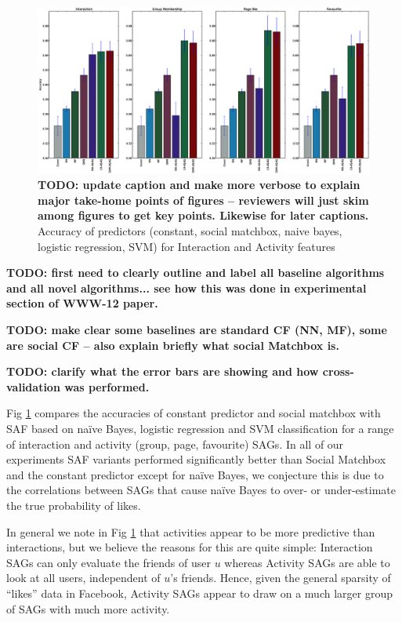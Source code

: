\begin{figure}[tbp!]
\hspace{-6mm}\includegraphics[width=190mm]{data/plots/accuracy/accuracyNew.eps}
\caption{ {\bf TODO: update caption and make more verbose to explain major take-home points of figures -- reviewers will just skim among figures to get key points.  Likewise for later captions.}  Accuracy of predictors (constant, social matchbox, naive bayes, logistic regression, SVM) for Interaction and Activity  features }
\label{Fig1}
\end{figure}

{\bf TODO: first need to clearly outline and label all baseline algorithms
           and all novel algorithms... see how this was done in experimental
           section of WWW-12 paper.}

{\bf TODO: make clear some baselines are standard CF (NN, MF), some are social CF -- also explain
           briefly what social Matchbox is.}

{\bf TODO: clarify what the error bars are showing and how
           cross-validation was performed.}

Fig \ref{Fig1} compares the accuracies of constant predictor and
social matchbox with SAF based on na\"{i}ve Bayes, logistic regression
and SVM classification for a range of interaction and activity (group,
page, favourite) SAGs.  In all of our experiments SAF variants
performed significantly better than Social Matchbox and the constant
predictor except for na\"{i}ve Bayes, we conjecture this is due to the
correlations between SAGs that cause na\"{i}ve Bayes to over- or
under-estimate the true probability of likes.

In general we note in Fig \ref{Fig1} that activities appear to be
more predictive than interactions, but we believe the reasons for this
are quite simple: Interaction SAGs can only evaluate the friends of
user $u$ whereas Activity SAGs are able to look at all users,
independent of $u$'s friends.
Hence, given the general sparsity of ``likes'' data in Facebook, 
Activity SAGs appear to draw on a much larger group of SAGs
with much more activity.

